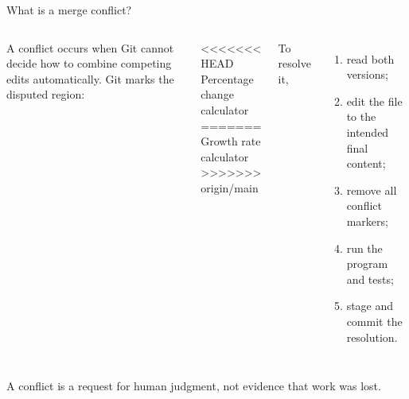 \documentclass[aspectratio=169,11pt]{beamer}
\newcommand{\backupend}{%
  \addtocounter{framenumberappendix}{-\value{framenumber}}%
  \addtocounter{framenumber}{\value{framenumberappendix}}}
\begin{document}
\begin{frame}{What is a merge conflict?}
\begin{columns}[T,onlytextwidth]
  A conflict occurs when Git cannot decide how to combine competing edits
  automatically. Git marks the disputed region:
  \vspace{0.5em}

  \ttfamily\scriptsize
  <<<<<<< HEAD\\
  Percentage change calculator\\
  =======\\
  Growth rate calculator\\
  >>>>>>> origin/main
  \rmfamily\normalsize

  To resolve it,
  \begin{enumerate}
    \item read both versions;
    \item edit the file to the intended final content;
    \item remove all conflict markers;
    \item run the program and tests;
    \item stage and commit the resolution.
  \end{enumerate}
\end{columns}

\vspace{0.7em}
A conflict is a request for human judgment, not evidence that work was lost.
\end{frame}

\backupend
\end{document}
